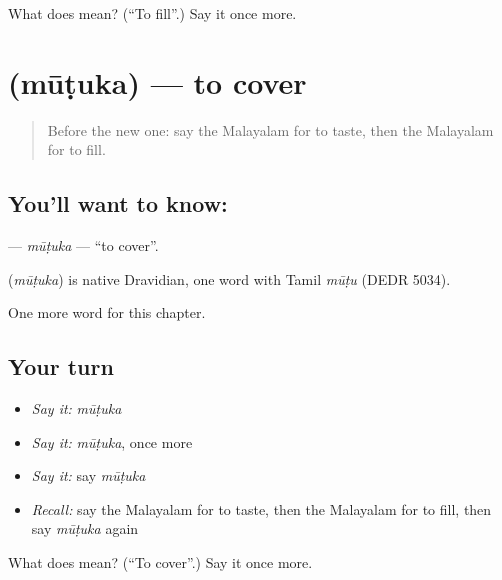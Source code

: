 \begin{tcolorbox}[breakable,colback=teal!4,colframe=teal!35!black,title={Before you move on}]
What does  mean? (\textquotedblleft{}To fill\textquotedblright{}.) Say it once more.
\end{tcolorbox}
\section[\texorpdfstring{\ml{മൂടുക} (mūṭuka)}{മൂടുക (mūṭuka)}]{ (mūṭuka) — to cover}

\label{lesson:ML-C224-mutuka}



\begin{quote}
Before the new one: say the Malayalam for to taste, then the Malayalam for to fill.
\end{quote}

\subsection*{You'll want to know: }
\textbf{} — \emph{mūṭuka} — \textquotedblleft{}to cover\textquotedblright{}.

\begin{cousinweb}
\textbf{} (\emph{mūṭuka}) is native Dravidian, one word with Tamil \emph{mūṭu} (DEDR 5034).
\end{cousinweb}

\begin{grammarlens}[title={What you've built}]
One more word for this chapter.
\end{grammarlens}

\subsection*{Your turn}
\begin{itemize}
\raggedright
  \item \emph{Say it:} \emph{mūṭuka}
  \item \emph{Say it:} \emph{mūṭuka}, once more
  \item \emph{Say it:} say \emph{mūṭuka}
  \item \emph{Recall:} say the Malayalam for to taste, then the Malayalam for to fill, then say \emph{mūṭuka} again
\end{itemize}

\begin{tcolorbox}[breakable,colback=teal!4,colframe=teal!35!black,title={Before you move on}]
What does  mean? (\textquotedblleft{}To cover\textquotedblright{}.) Say it once more.
\end{tcolorbox}
